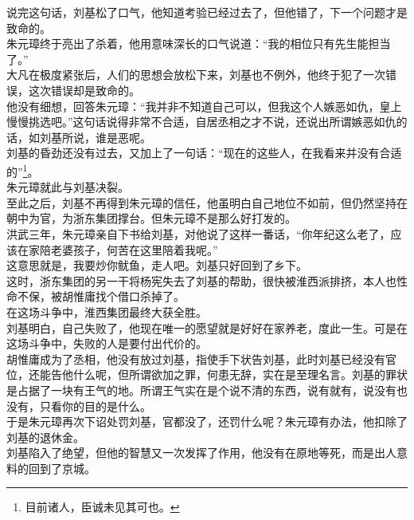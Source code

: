 \begin{multicols}{\theparacolNo}
说完这句话，刘基松了口气，他知道考验已经过去了，但他错了，下一个问题才是致命的。\\

朱元璋终于亮出了杀着，他用意味深长的口气说道：“我的相位只有先生能担当了。”\\

大凡在极度紧张后，人们的思想会放松下来，刘基也不例外，他终于犯了一次错误，这次错误却是致命的。\\

他没有细想，回答朱元璋：“我并非不知道自己可以，但我这个人嫉恶如仇，皇上慢慢挑选吧。”这句话说得非常不合适，自居丞相之才不说，还说出所谓嫉恶如仇的话，如刘基所说，谁是恶呢。\\

刘基的昏劲还没有过去，又加上了一句话：“现在的这些人，在我看来并没有合适的”\footnote{目前诸人，臣诚未见其可也。}。\\

朱元璋就此与刘基决裂。\\

至此之后，刘基不再得到朱元璋的信任，他虽明白自己地位不如前，但仍然坚持在朝中为官，为浙东集团撑台。但朱元璋不是那么好打发的。\\

洪武三年，朱元璋亲自下书给刘基，对他说了这样一番话，“你年纪这么老了，应该在家陪老婆孩子，何苦在这里陪着我呢。”\\

这意思就是，我要炒你鱿鱼，走人吧。刘基只好回到了乡下。\\

这时，浙东集团的另一干将杨宪失去了刘基的帮助，很快被淮西派排挤，本人也性命不保，被胡惟庸找个借口杀掉了。\\

在这场斗争中，淮西集团最终大获全胜。\\

刘基明白，自己失败了，他现在唯一的愿望就是好好在家养老，度此一生。可是在这场斗争中，失败的人是要付出代价的。\\

胡惟庸成为了丞相，他没有放过刘基，指使手下状告刘基，此时刘基已经没有官位，还能告他什么呢，但所谓欲加之罪，何患无辞，实在是至理名言。刘基的罪状是占据了一块有王气的地。所谓王气实在是个说不清的东西，说有就有，说没有也没有，只看你的目的是什么。\\

于是朱元璋再次下诏处罚刘基，官都没了，还罚什么呢？朱元璋有办法，他扣除了刘基的退休金。\\

刘基陷入了绝望，但他的智慧又一次发挥了作用，他没有在原地等死，而是出人意料的回到了京城。\\


\end{multicols}
